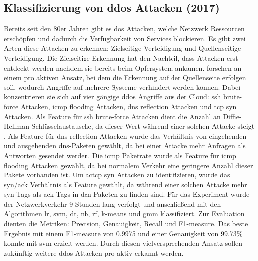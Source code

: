 \documentclass[
    12pt, %
    DIV10,
    ngerman, %
    a4paper, %
    oneside, %
    titlepage, %
    parskip=half, %
    headings=normal, %
    listof=totoc, %
    bibliography=totoc, %
    index=totoc, %
    captions=tableheading, %
    final %
]{scrreprt}
\begin{document}
\subsection{Klassifizierung von \ac{ddos} Attacken (2017)}
Bereits seit den 80er Jahren gibt es \ac{dos} Attacken, welche Netzwerk Ressourcen erschöpfen und dadurch die Verfügbarkeit von Services blockieren. Es gibt zwei Arten diese Attacken zu erkennen: Zielseitige Verteidigung und Quellenseitige Verteidigung\parencite{He2017}. Die Zielseitige Erkennung hat den Nachteil, dass Attacken erst entdeckt werden nachdem sie bereits beim Opfersystem ankamen. \textcite{He2017} forschen an einem pro aktiven Ansatz, bei dem die Erkennung auf der Quellenseite erfolgen soll, wodurch Angriffe auf mehrere Systeme verhindert werden können. Dabei konzentrieren sie sich auf vier gängige \ac{ddos} Angriffe aus der Cloud: \ac{ssh} brute-force Attacken, \ac{icmp} flooding Attacken, \ac{dns} reflection Attacken und \ac{tcp} \ac{syn} Attacken. Als Feature für \ac{ssh} brute-force Attacken dient die Anzahl an Diffie-Hellman Schlüsselaustausche, da dieser Wert während einer solchen Attacke steigt \parencite{He2017}. Als Feature für \ac{dns} reflection Attacken wurde das Verhältnis von eingehenden und ausgehenden \ac{dns}-Paketen gewählt, da bei einer Attacke mehr Anfragen als Antworten gesendet werden. Die \ac{icmp} Paketrate wurde als Feature für \ac{icmp} flooding Attacken gewählt, da bei normalem Verkehr eine geringere Anzahl dieser Pakete vorhanden ist. Um ac{tcp} \ac{syn} Attacken zu identifizieren, wurde das \ac{syn}/\ac{ack} Verhältnis als Feature gewählt, da während einer solchen Attacke mehr \ac{syn} Tags als \ac{ack} Tags in den Paketen zu finden sind. Für das Experiment wurde der Netzwerkverkehr 9 Stunden lang verfolgt und anschließend mit den Algorithmen \ac{lr}, \ac{svm}, \ac{dt}, \ac{nb}, \ac{rf}, k-means und \ac{gmm} klassifiziert. Zur Evaluation dienten die Metriken: Precision, Genauigkeit, Recall und F1-measure. Das beste Ergebnis mit einem F1-measure von 0.9975 und einer Genauigkeit von 99.73\% konnte mit \ac{svm} erzielt werden.
Durch diesen vielversprechenden Ansatz sollen zukünftig weitere \ac{ddos} Attacken pro aktiv erkannt werden.
%
\end{document}
